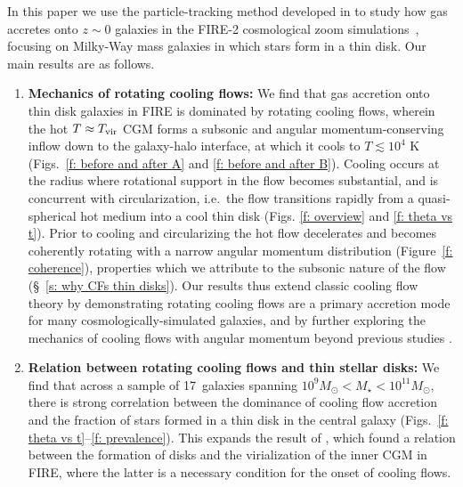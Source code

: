 \documentclass[fleqn,usenatbib]{mnras}
\newcommand{\Nsample}{17}
\begin{document}
In this paper we use the particle-tracking method developed in \cite{Hafen2019,Hafen2020} to study how gas accretes onto $z\sim0$ galaxies in the FIRE-2 cosmological zoom simulations~\citep{Hopkins2018}, focusing on Milky-Way mass galaxies in which stars form in a thin disk. 
Our main results are as follows.
\begin{enumerate}
    \item \textbf{Mechanics of rotating cooling flows:}
    We find that gas accretion onto thin disk galaxies in FIRE is dominated by rotating cooling flows, wherein the hot $T\approx T_{\rm vir}$ CGM forms a subsonic and angular momentum-conserving inflow down to the galaxy-halo interface, at which it cools to $T\lesssim10^4$ K (Figs.~\ref{f: before and after A} and \ref{f: before and after B}).
    Cooling occurs at the radius where rotational support in the flow becomes substantial, and is concurrent with circularization, i.e.~the flow transitions rapidly from a quasi-spherical hot medium into a cool thin disk (Figs. \ref{f: overview} and \ref{f: theta vs t}).
    Prior to cooling and circularizing the hot flow decelerates and becomes coherently rotating with a narrow angular momentum distribution (Figure~\ref{f: coherence}), properties which we attribute to the subsonic nature of the flow (\S~\ref{s: why CFs thin disks}).
    Our results thus extend classic cooling flow theory by demonstrating rotating cooling flows are a primary accretion mode for many cosmologically-simulated galaxies, and by further exploring the mechanics of cooling flows with angular momentum beyond previous studies \citep{Cowie1980, Stern2019}. 
    \item \textbf{Relation between rotating cooling flows and thin stellar disks:}
    We find that across a sample of \Nsample~galaxies spanning $10^9 M_\odot < M_\star < 10^{11} M_\odot$, there is strong correlation between the dominance of cooling flow accretion and the fraction of stars formed in a thin disk in the central galaxy (Figs.~\ref{f: theta vs t}--\ref{f: prevalence}).
    This expands the result of \cite{Stern2021}, which found a relation between the formation of disks and the virialization of the inner CGM in FIRE, where the latter is a necessary condition for the onset of cooling flows. 

\end{enumerate}
\end{document}
